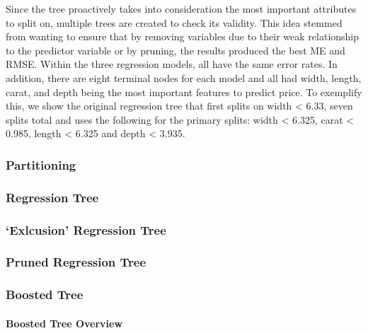 \documentclass[
  paper=a4,
  ,captions=tableheading
]{scrartcl}
\begin{document}
Since the tree proactively takes into consideration the most important
attributes to split on, multiple trees are created to check its
validity. This idea stemmed from wanting to ensure that by removing
variables due to their weak relationship to the predictor variable or by
pruning, the results produced the best ME and RMSE. Within the three
regression models, all have the same error rates. In addition, there are
eight terminal nodes for each model and all had width, length, carat,
and depth being the most important features to predict price. To
exemplify this, we show the original regression tree that first splits
on width \textless{} 6.33, seven splits total and uses the following for
the primary splits: width \textless{} 6.325, carat \textless{} 0.985,
length \textless{} 6.325 and depth \textless{} 3.935.

\hypertarget{partitioning}{%
\subsubsection{Partitioning}\label{partitioning}}

\hypertarget{regression-tree}{%
\subsubsection{Regression Tree}\label{regression-tree}}

\hypertarget{exlcusion-regression-tree}{%
\subsubsection{`Exlcusion' Regression
Tree}\label{exlcusion-regression-tree}}

\hypertarget{pruned-regression-tree}{%
\subsubsection{Pruned Regression Tree}\label{pruned-regression-tree}}

\hypertarget{boosted-tree}{%
\subsubsection{Boosted Tree}\label{boosted-tree}}

\hypertarget{boosted-tree-overview}{%
\paragraph{Boosted Tree Overview}\label{boosted-tree-overview}}
\end{document}
